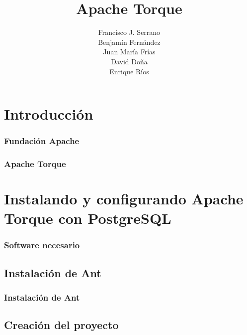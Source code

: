 \documentclass[24pt, a4paper, oneside, spanish]{beamer}
\begin{document}
\title{Apache Torque}
\author{
	Francisco J. Serrano\\
	Benjamín Fernández\\
	Juan María Frías\\
	David Doña\\
	Enrique Ríos
}

\begin{frame}
\titlepage
\end{frame}

\section{Introducción}

\begin{frame}[allowframebreaks]
	\frametitle{Fundación Apache}
	
	
\end{frame}

\begin{frame}[allowframebreaks]
	\frametitle{Apache Torque}
	
	
\end{frame}

\section{Instalando y configurando Apache Torque con PostgreSQL}

\begin{frame}
	\frametitle{Software necesario}
	
	
\end{frame}

\subsection{Instalación de Ant}
\begin{frame}
	\frametitle{Instalación de Ant}
	
	
\end{frame}

\subsection{Creación del proyecto}
\end{document}
